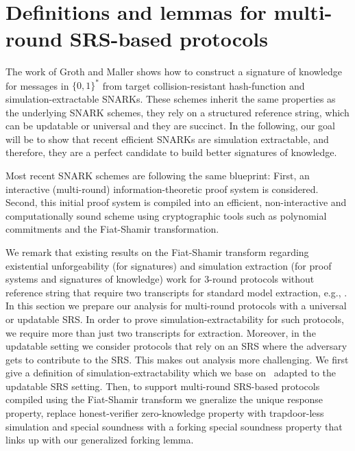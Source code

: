 \section{Definitions and lemmas for multi-round SRS-based protocols}
\label{sec:se_definitions}


The work of Groth and Maller  \cite{C:GroMal17} shows
how to construct a signature of knowledge for messages in $\{0, 1\}^*$
from  target collision-resistant hash-function and simulation-extractable SNARKs. 
These schemes inherit the same properties as the underlying SNARK schemes, 
they rely on a structured reference string, which can be updatable or universal and they are succinct. 
In the following, our goal will be to show that recent efficient SNARKs are simulation extractable,  and therefore, they are a perfect candidate to build better signatures of knowledge. 
 

Most recent SNARK schemes are following the same blueprint: First, an interactive (multi-round) information-theoretic proof system is considered. 
Second,  this initial proof system is compiled into an efficient, non-interactive and computationally sound scheme using cryptographic tools such as polynomial commitments and the Fiat-Shamir transformation.

We remark that existing results on the Fiat-Shamir transform regarding existential unforgeability (for signatures) and simulation extraction (for proof systems and signatures of knowledge) work for $3$-round protocols without reference string that require two transcripts for standard model extraction, e.g., \cite{JC:PoiSte00,INDOCRYPT:FKMV12,C:RotSeg21}.
In this section we prepare our analysis for multi-round protocols with a universal or updatable SRS.
In order to prove simulation-extractability for such protocols,  we require more than
just two transcripts for extraction.  Moreover, in the updatable setting we consider protocols that rely on an SRS where the adversary gets to contribute to the SRS. This makes out analysis more challenging.
We first give a definition of simulation-extractability which we base on~\cite{INDOCRYPT:FKMV12} adapted to the updatable SRS setting. Then, to support multi-round SRS-based protocols compiled using the Fiat-Shamir transform we gneralize the unique response property, replace honest-verifier zero-knowledge property with trapdoor-less simulation and special soundness with a forking special soundness property that links up with our generalized forking lemma.

